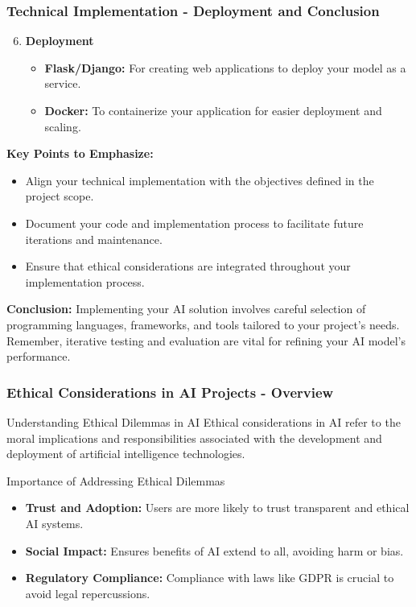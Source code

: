 \documentclass[aspectratio=169]{beamer}
\begin{document}
\begin{frame}[fragile]
    \frametitle{Technical Implementation - Deployment and Conclusion}
    \begin{enumerate}
        \setcounter{enumi}{5}
        \item \textbf{Deployment}
        \begin{itemize}
            \item \textbf{Flask/Django:} For creating web applications to deploy your model as a service.
            \item \textbf{Docker:} To containerize your application for easier deployment and scaling.
        \end{itemize}
    \end{enumerate}

    \textbf{Key Points to Emphasize:}
    \begin{itemize}
        \item Align your technical implementation with the objectives defined in the project scope.
        \item Document your code and implementation process to facilitate future iterations and maintenance.
        \item Ensure that ethical considerations are integrated throughout your implementation process.
    \end{itemize}

    \textbf{Conclusion:} 
    Implementing your AI solution involves careful selection of programming languages, frameworks, and tools tailored to your project's needs. Remember, iterative testing and evaluation are vital for refining your AI model's performance.
\end{frame}

\begin{frame}[fragile]
    \frametitle{Ethical Considerations in AI Projects - Overview}
    \begin{block}{Understanding Ethical Dilemmas in AI}
        Ethical considerations in AI refer to the moral implications and responsibilities associated with the development and deployment of artificial intelligence technologies.
    \end{block}

    \begin{block}{Importance of Addressing Ethical Dilemmas}
        \begin{itemize}
            \item \textbf{Trust and Adoption:} Users are more likely to trust transparent and ethical AI systems.
            \item \textbf{Social Impact:} Ensures benefits of AI extend to all, avoiding harm or bias.
            \item \textbf{Regulatory Compliance:} Compliance with laws like GDPR is crucial to avoid legal repercussions.
        \end{itemize}
    \end{block}
\end{frame}
\end{document}
